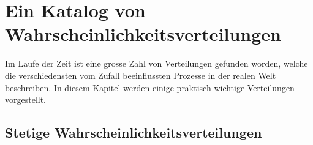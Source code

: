 %
%
%
\chapter{Ein Katalog von Wahrscheinlichkeitsverteilungen}
\label{chapter:wahrscheinlichkeitsverteilung-katalog}
Im Laufe der Zeit ist eine grosse Zahl von Verteilungen gefunden worden,
welche die verschiedensten vom Zufall beeinflussten Prozesse in der realen
Welt beschreiben.
In diesem Kapitel werden einige praktisch wichtige Verteilungen vorgestellt.

\section{Stetige Wahrscheinlichkeitsverteilungen}











